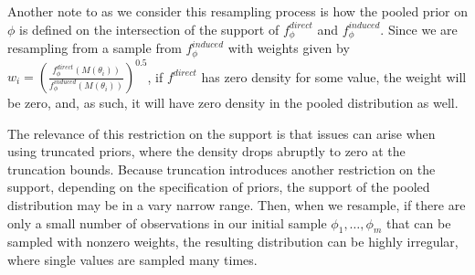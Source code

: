 \documentclass[12pt,twoside]{smiththesis}
\begin{document}
Another note to as we consider this resampling process is how the pooled prior on \(\phi\) is defined on the intersection of the support of \(f_\phi^{direct}\) and \(f_\phi^{induced}\). Since we are resampling from a sample from \(f_\phi^{induced}\) with weights given by \(w_i = \left( \frac{f_\phi^{direct}(M(\theta_i))}{f_\phi^{induced}(M(\theta_i))} \right)^{0.5}\), if \(f^{direct}\) has zero density for some value, the weight will be zero, and, as such, it will have zero density in the pooled distribution as well.

The relevance of this restriction on the support is that issues can arise when using truncated priors, where the density drops abruptly to zero at the truncation bounds. Because truncation introduces another restriction on the support, depending on the specification of priors, the support of the pooled distribution may be in a vary narrow range. Then, when we resample, if there are only a small number of observations in our initial sample \(\phi_1,\dots,\phi_m\) that can be sampled with nonzero weights, the resulting distribution can be highly irregular, where single values are sampled many times.
\end{document}
